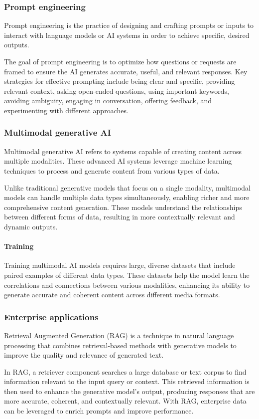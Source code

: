 \subsubsection{Prompt engineering}
\begin{definition}
    Prompt engineering is the practice of designing and crafting prompts or inputs to interact with language models or AI systems in order to achieve specific, desired outputs.
\end{definition}
\noindent The goal of prompt engineering is to optimize how questions or requests are framed to ensure the AI generates accurate, useful, and relevant responses. 
Key strategies for effective prompting include being clear and specific, providing relevant context, asking open-ended questions, using important keywords, avoiding ambiguity, engaging in conversation, offering feedback, and experimenting with different approaches.

\subsubsection{Multimodal generative AI}
Multimodal generative AI refers to systems capable of creating content across multiple modalities. 
These advanced AI systems leverage machine learning techniques to process and generate content from various types of data.

Unlike traditional generative models that focus on a single modality, 
multimodal models can handle multiple data types simultaneously, enabling richer and more comprehensive content generation. 
These models understand the relationships between different forms of data, resulting in more contextually relevant and dynamic outputs.

\paragraph*{Training}
Training multimodal AI models requires large, diverse datasets that include paired examples of different data types.
 These datasets help the model learn the correlations and connections between various modalities, enhancing its ability to generate accurate and coherent content across different media formats.

\subsubsection{Enterprise applications}
\begin{definition}
    Retrieval Augmented Generation (RAG) is a technique in natural language processing that combines retrieval-based methods with generative models to improve the quality and relevance of generated text.
\end{definition}
\noindent In RAG, a retriever component searches a large database or text corpus to find information relevant to the input query or context. 
This retrieved information is then used to enhance the generative model's output, producing responses that are more accurate, coherent, and contextually relevant. 
With RAG, enterprise data can be leveraged to enrich prompts and improve performance.

